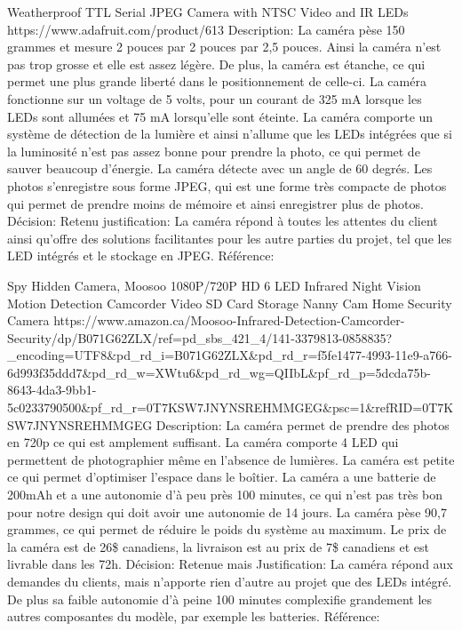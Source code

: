 	Weatherproof TTL Serial JPEG Camera with NTSC Video and IR LEDs
	https://www.adafruit.com/product/613
	Description: La caméra pèse 150 grammes et mesure 2 pouces par 2 pouces par 2,5 pouces. Ainsi la caméra n’est pas trop grosse et elle est assez légère. De plus, la caméra est étanche, ce qui permet une plus grande liberté dans le positionnement de celle-ci. La caméra fonctionne sur un voltage de 5 volts, pour un courant de 325 mA lorsque les LEDs sont allumées et 75 mA lorsqu’elle sont éteinte. La caméra comporte un système de détection de la lumière et ainsi n’allume que les LEDs intégrées que si la luminosité n’est pas assez bonne pour prendre la photo, ce qui permet de sauver beaucoup d’énergie. La caméra détecte avec un angle de 60 degrés. Les photos s’enregistre sous forme JPEG, qui est une forme très compacte de photos qui permet de prendre moins de mémoire et ainsi enregistrer plus de photos.
	Décision: Retenu
	justification: La caméra répond à toutes les attentes du client ainsi qu’offre des solutions facilitantes pour les autre parties du projet, tel que les LED intégrés et le stockage en JPEG.
	Référence:
	
	Spy Hidden Camera, Moosoo 1080P/720P HD 6 LED Infrared Night Vision Motion Detection Camcorder Video SD Card Storage Nanny Cam Home Security Camera
	https://www.amazon.ca/Moosoo-Infrared-Detection-Camcorder-Security/dp/B071G62ZLX/ref=pd\_sbs\_421\_4/141-3379813-0858835?\_encoding=UTF8\&pd\_rd\_i=B071G62ZLX\&pd\_rd\_r=f5fe1477-4993-11e9-a766-6d993f35ddd7\&pd\_rd\_w=XWtu6\&pd\_rd\_wg=QIIbL\&pf\_rd\_p=5dcda75b-8643-4da3-9bb1-5c0233790500\&pf\_rd\_r=0T7KSW7JNYNSREHMMGEG\&psc=1\&refRID=0T7KSW7JNYNSREHMMGEG
	Description:  La caméra permet de prendre des photos en 720p ce qui est amplement suffisant. La caméra comporte 4 LED qui permettent de photographier même en l’absence de lumières. La caméra est petite ce qui permet d’optimiser l’espace dans le boîtier. La caméra a une batterie de 200mAh et a une autonomie d’à peu près 100 minutes, ce qui n’est pas très bon pour notre design qui doit avoir une autonomie de 14 jours. La caméra pèse 90,7 grammes, ce qui permet de réduire le poids du système au maximum. Le prix de la caméra est de 26\$ canadiens, la livraison est au prix de 7\$ canadiens et est livrable dans les 72h.
	Décision: Retenue mais
	Justification: La caméra répond aux demandes du clients, mais n’apporte rien d’autre au projet que des LEDs intégré. De plus sa faible autonomie d’à peine 100 minutes complexifie grandement les autres composantes du modèle, par exemple les batteries.
	Référence:
	
